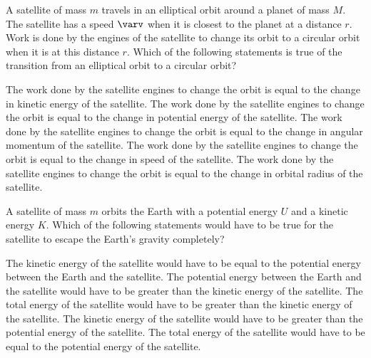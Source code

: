 \documentclass{../../../oss-apphys-exam}
\begin{document}
\begin{multicols*}{2}
\begin{questions}
    \question A satellite of mass $m$ travels in an elliptical orbit around a
    planet of mass $M$. The satellite has a speed $\varv$ when it is closest to
    the planet at a distance $r$. Work is done by the engines of the satellite
    to change its orbit to a circular orbit when it is at this distance $r$.
    Which of the following statements is true of the transition from an
    elliptical orbit to a circular orbit?
    \begin{choices}
      \choice The work done by the satellite engines to change the orbit is
      equal to the change in kinetic energy of the satellite.
      \choice The work done by the satellite engines to change the orbit is
      equal to the change in potential energy of the satellite.
      \choice The work done by the satellite engines to change the orbit is
      equal to the change in angular momentum of the satellite.
      \choice The work done by the satellite engines to change the orbit is
      equal to the change in speed of the satellite.
      \choice The work done by the satellite engines to change the orbit is
      equal to the change in orbital radius of the satellite.
    \end{choices}
    
    \question A satellite of mass $m$ orbits the Earth with a potential energy
    $U$ and a kinetic energy $K$. Which of the following statements would have
    to be true for the satellite to escape the Earth's gravity completely?
    \begin{choices}
      \choice The kinetic energy of the satellite would have to be equal to the
      potential energy between the Earth and the satellite.
      \choice The potential energy between the Earth and the satellite would
      have to be greater than the kinetic energy of the satellite.
      \choice The total energy of the satellite would have to be greater than
      the kinetic energy of the satellite.
      \choice The kinetic energy of the satellite would have to be greater than
      the potential energy of the satellite.
      \choice The total energy of the satellite would have to be equal to the
      potential energy of the satellite.
    \end{choices}
  \end{questions}
\end{multicols*}
\newpage


\genfreedirections
\end{document}
